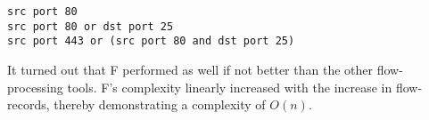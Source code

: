 \begin{lstlisting}
src port 80
src port 80 or dst port 25
src port 443 or (src port 80 and dst port 25)
\end{lstlisting}

It turned out that F performed as well if not better than the other
flow-processing tools. F's complexity linearly increased with the increase in
flow-records, thereby demonstrating a complexity of $O(n)$.
